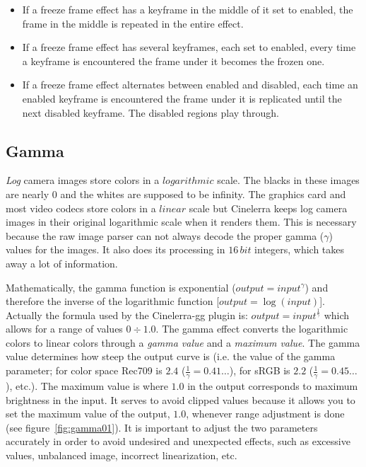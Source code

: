 \begin{itemize}
    \item If a freeze frame effect has a keyframe in the middle of it set to enabled, the frame in the middle is repeated in the entire effect.
    \item If a freeze frame effect has several keyframes, each set to enabled, every time a keyframe is encountered the frame under it becomes the frozen one.
    \item If a freeze frame effect alternates between enabled and disabled, each time an enabled keyframe is encountered the frame under it is replicated until the next disabled keyframe. The disabled regions play through.
\end{itemize}

\subsection{Gamma}%
\label{sub:gamma}

\textit{Log} camera images store colors in a $logarithmic$ scale. The blacks in these images are nearly $0$ and the whites are supposed to be infinity. The graphics card and most video codecs store colors in a $linear$ scale but Cinelerra keeps log camera images in their original logarithmic scale when it renders them. This is necessary because the raw image parser can not always decode the proper gamma ($\gamma$) values for the images. It also does its processing in $16\,bit$ integers, which takes away a lot of information.

Mathematically, the gamma function is exponential ($output = input^{\gamma}$) and therefore the inverse of the logarithmic function [$output = \log(input)$]. Actually the formula used by the Cinelerra-gg plugin is: $output = input^{\frac{1}{\gamma}}$ which allows for a range of values $0 \div 1.0$. The gamma effect converts the logarithmic colors to linear colors through a \textit{gamma value} and a \textit{maximum value}. The gamma value determines how steep the output curve is (i.e. the value of the gamma parameter; for color space Rec709 is $2.4$ ($\frac{1}{\gamma} =0.41\dots$), for sRGB is $2.2$ ($\frac{1}{\gamma} =0.45\dots$), etc.). The maximum value is where $1.0$ in the output corresponds to maximum brightness in the input. It serves to avoid clipped values because it allows you to set the maximum value of the output, $1.0$, whenever range adjustment is done (see figure~\ref{fig:gamma01}). It is important to adjust the two parameters accurately in order to avoid undesired and unexpected effects, such as excessive values, unbalanced image, incorrect linearization, etc.

